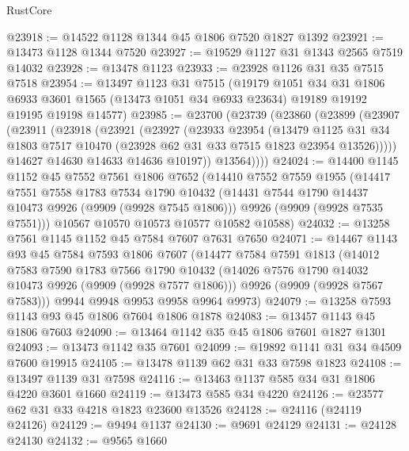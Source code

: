 \begin{lexlean}{RustCore}
\begin{coremodule}
@23918 := @14522 @1128 @1344 @45 @1806 @7520 @1827 @1392
@23921 := @13473 @1128 @1344 @7520
@23927 := @19529 @1127 @31 @1343 @2565 @7519 @14032
@23928 := @13478 @1123
@23933 := @23928 @1126 @31 @35 @7515 @7518
@23954 := @13497
    @1123
    @31
    @7515
    (@19179
      @1051
      @34
      @31
      @1806
      @6933
      @3601
      @1565
      (@13473 @1051 @34 @6933 @23634)
      @19189
      @19192
      @19195
      @19198
      @14577)
@23985 := @23700
    (@23739
      (@23860
        (@23899
          (@23907
            (@23911
              (@23918
                (@23921
                  (@23927
                    (@23933
                      @23954
                      (@13479
                        @1125
                        @31
                        @34
                        @1803
                        @7517
                        @10470
                        (@23928 @62 @31 @33 @7515 @1823 @23954 @13526)))))
                @14627
                @14630
                @14633
                @14636
                @10197))
            @13564))))
@24024 := @14400
    @1145
    @1152
    @45
    @7552
    @7561
    @1806
    @7652
    (@14410
      @7552
      @7559
      @1955
      (@14417
        @7551
        @7558
        @1783
        @7534
        @1790
        @10432
        (@14431 @7544 @1790 @14437 @10473 @9926 (@9909 (@9928 @7545 @1806)))
        @9926
        (@9909 (@9928 @7535 @7551)))
      @10567
      @10570
      @10573
      @10577
      @10582
      @10588)
@24032 := @13258 @7561 @1145 @1152 @45 @7584 @7607 @7631 @7650
@24071 := @14467
    @1143
    @93
    @45
    @7584
    @7593
    @1806
    @7607
    (@14477
      @7584
      @7591
      @1813
      (@14012
        @7583
        @7590
        @1783
        @7566
        @1790
        @10432
        (@14026 @7576 @1790 @14032 @10473 @9926 (@9909 (@9928 @7577 @1806)))
        @9926
        (@9909 (@9928 @7567 @7583)))
      @9944
      @9948
      @9953
      @9958
      @9964
      @9973)
@24079 := @13258 @7593 @1143 @93 @45 @1806 @7604 @1806 @1878
@24083 := @13457 @1143 @45 @1806 @7603
@24090 := @13464 @1142 @35 @45 @1806 @7601 @1827 @1301
@24093 := @13473 @1142 @35 @7601
@24099 := @19892 @1141 @31 @34 @4509 @7600 @19915
@24105 := @13478 @1139 @62 @31 @33 @7598 @1823
@24108 := @13497 @1139 @31 @7598
@24116 := @13463 @1137 @585 @34 @31 @1806 @4220 @3601 @1660
@24119 := @13473 @585 @34 @4220
@24126 := @23577 @62 @31 @33 @4218 @1823 @23600 @13526
@24128 := @24116 (@24119 @24126)
@24129 := @9494 @1137
@24130 := @9691 @24129
@24131 := @24128 @24130
@24132 := @9565 @1660

\end{coremodule}
\end{lexlean}

